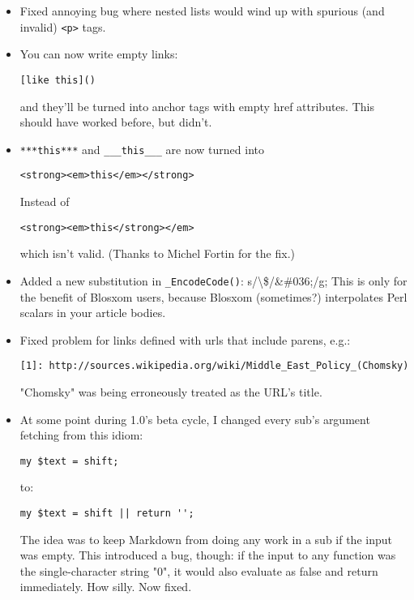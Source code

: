 \begin{itemize}
\item 

Fixed annoying bug where nested lists would wind up with
spurious (and invalid) \texttt{<p>} tags.
\item 

You can now write empty links:\begin{lstlisting}
[like this]()
\end{lstlisting}


and they'll be turned into anchor tags with empty href attributes.
This should have worked before, but didn't.
\item 

\texttt{***this***} and \texttt{\_\_\_this\_\_\_} are now turned into\begin{lstlisting}
<strong><em>this</em></strong>
\end{lstlisting}


Instead of\begin{lstlisting}
<strong><em>this</strong></em>
\end{lstlisting}


which isn't valid. (Thanks to Michel Fortin for the fix.)
\item 

Added a new substitution in \texttt{\_EncodeCode()}: s/\textbackslash\$/\&\#036;/g; This
is only for the benefit of Blosxom users, because Blosxom
(sometimes?) interpolates Perl scalars in your article bodies.
\item 

Fixed problem for links defined with urls that include parens, e.g.:\begin{lstlisting}
[1]: http://sources.wikipedia.org/wiki/Middle_East_Policy_(Chomsky)
\end{lstlisting}


"Chomsky" was being erroneously treated as the URL's title.
\item 

At some point during 1.0's beta cycle, I changed every sub's
argument fetching from this idiom:\begin{lstlisting}
my $text = shift;
\end{lstlisting}


to:\begin{lstlisting}
my $text = shift || return '';
\end{lstlisting}


The idea was to keep Markdown from doing any work in a sub
if the input was empty. This introduced a bug, though:
if the input to any function was the single-character string
"0", it would also evaluate as false and return immediately.
How silly. Now fixed.
\end{itemize}


